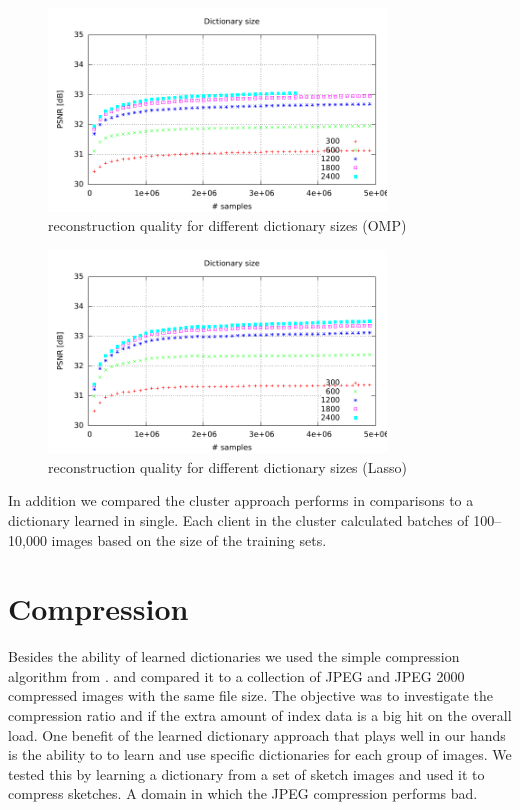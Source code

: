 \begin{figure}[h]
\centering
\includegraphics[width = 0.8\textwidth]{../tests/results/old/dictSizeOMP.pdf}
\caption{reconstruction quality for different dictionary sizes (OMP)}
\label{fig:dictSizeOMP}
\end{figure}


\begin{figure}[h]
\centering
\includegraphics[width = 0.8\textwidth]{../tests/results/old/dictSizeLasso.pdf}
\caption{reconstruction quality for different dictionary sizes (Lasso)}
\label{fig:dict size}
\end{figure}

In addition we compared the cluster approach performs in
comparisons to a dictionary learned in single. Each client in the cluster
calculated batches of 100--10,000 images based on the
size of the training sets.



\newpage
\section{Compression}
Besides the ability of learned dictionaries 
we used the simple compression algorithm from  .
and compared it to a collection of JPEG and JPEG 2000 compressed images with the
same file size. The objective was to investigate the compression ratio and if
the extra amount of index data is a big hit on the overall load.
One benefit of the learned dictionary approach that plays well in our
hands is the ability to to learn and use specific dictionaries for each group of
images. We tested this by learning a dictionary from a set of sketch images and
used it to compress sketches. A domain in which the JPEG compression performs
bad.

